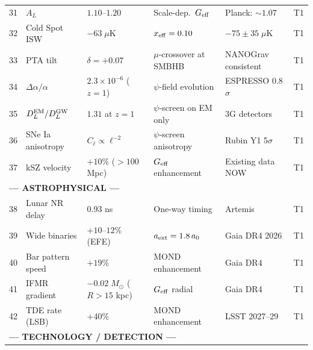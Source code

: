 \documentclass[12pt,a4paper]{article}
\begin{document}
{\begin{longtable}{p{0.4cm}p{2.3cm}p{2.8cm}p{2.4cm}p{2.2cm}p{1.5cm}}
31 & $A_L$ & $1.10$--$1.20$ &
  Scale-dep.\ $G_{\rm eff}$ &
  Planck: $\sim 1.07$ &
  \textcolor{tier1}{T1} \\[2pt]

32 & Cold Spot ISW & $-63\;\mu$K &
  $x_{\rm eff} = 0.10$ &
  $-75 \pm 35\;\mu$K &
  \textcolor{tier1}{T1} \\[2pt]

33 & PTA tilt & $\delta = +0.07$ &
  $\mu$-crossover at SMBHB &
  NANOGrav consistent &
  \textcolor{tier1}{T1} \\[2pt]

34 & $\Delta\alpha/\alpha$ & $2.3 \times 10^{-6}$ ($z=1$) &
  $\psi$-field evolution &
  ESPRESSO 0.8$\sigma$ &
  \textcolor{tier1}{T1} \\[2pt]

35 & $D_L^{\rm EM}/D_L^{\rm GW}$ & $1.31$ at $z=1$ &
  $\psi$-screen on EM only &
  3G detectors &
  \textcolor{tier1}{T1} \\[2pt]

36 & SNe Ia anisotropy & $C_\ell \propto \ell^{-2}$ &
  $\psi$-screen anisotropy &
  Rubin Y1 5$\sigma$ &
  \textcolor{tier1}{T1} \\[2pt]

37 & kSZ velocity & $+10\%$ ($>100$ Mpc) &
  $G_{\rm eff}$ enhancement &
  Existing data NOW &
  \textcolor{tier1}{T1} \\[3pt]

\midrule
\multicolumn{6}{l}{\textbf{\textcolor{derived}{--- ASTROPHYSICAL ---}}} \\
\midrule

38 & Lunar NR delay & 0.93 ns &
  One-way timing &
  Artemis &
  \textcolor{tier1}{T1} \\[2pt]

39 & Wide binaries & $+10$--$12\%$ (EFE) &
  $a_{\rm ext} = 1.8\,a_0$ &
  Gaia DR4 2026 &
  \textcolor{tier1}{T1} \\[2pt]

40 & Bar pattern speed & $+19\%$ &
  MOND enhancement &
  Gaia DR4 &
  \textcolor{tier1}{T1} \\[2pt]

41 & IFMR gradient & $-0.02\;M_\odot$ ($R>15$ kpc) &
  $G_{\rm eff}$ radial &
  Gaia DR4 &
  \textcolor{tier1}{T1} \\[2pt]

42 & TDE rate (LSB) & $+40\%$ &
  MOND enhancement &
  LSST 2027--29 &
  \textcolor{tier1}{T1} \\[3pt]

\midrule
\multicolumn{6}{l}{\textbf{\textcolor{derived}{--- TECHNOLOGY / DETECTION ---}}} \\
\midrule


\end{longtable}}
\end{document}
